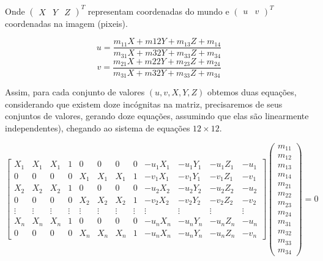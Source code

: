 \documentclass[ecp,tc]{iiufrgs}
\begin{document}
Onde $ \begin{pmatrix} X & Y & Z \end{pmatrix}^T $ representam coordenadas do mundo e $ \begin{pmatrix} u & v \end{pmatrix}^T $ coordenadas na imagem (pixeis).

\[
u = \dfrac{m_{11}X + m{12}Y + m_{13}Z + m_{14}}{m_{31}X + m{32}Y + m_{33}Z + m_{34}}
\]
\[
v = \dfrac{m_{21}X + m{22}Y + m_{23}Z + m_{24}}{m_{31}X + m{32}Y + m_{33}Z + m_{34}}
\]

Assim, para cada conjunto de valores $ (u, v, X, Y, Z) $ obtemos duas equações, considerando que existem doze incógnitas na matriz, precisaremos de seus conjuntos de valores, gerando doze equações, assumindo que elas são linearmente independentes),
chegando ao sistema de equações $ 12\times12 $.

\setcounter{MaxMatrixCols}{20}

\[
\begin{bmatrix}
X_1 & X_1 & X_1 & 1 & 0 & 0 & 0 & 0 & -u_1X_1 & -u_1Y_1 & -u_1Z_1 & -u_1 \\
0 & 0 & 0 & 0 & X_1 & X_1 & X_1 & 1 & -v_1X_1 & -v_1Y_1 & -v_1Z_1 & -v_1 \\
X_2 & X_2 & X_2 & 1 & 0 & 0 & 0 & 0 & -u_2X_2 & -u_2Y_2 & -u_2Z_2 & -u_2 \\
0 & 0 & 0 & 0 & X_2 & X_2 & X_2 & 1 & -v_2X_2 & -v_2Y_2 & -v_2Z_2 & -v_2 \\
\vdots & \vdots & \vdots & \vdots & \vdots & \vdots & \vdots & \vdots & \vdots & \vdots & \vdots & \vdots \\
X_n & X_n & X_n & 1 & 0 & 0 & 0 & 0 & -u_nX_n & -u_nY_n & -u_nZ_n & -u_n \\
0 & 0 & 0 & 0 & X_n & X_n & X_n & 1 & -u_nX_n & -u_nY_n & -u_nZ_n & -v_n 
\end{bmatrix}
\begin{pmatrix}m_{11} \\ m_{12} \\ m_{13} \\ m_{14} \\ m_{21} \\ m_{22} \\ m_{23} \\ m_{24} \\ m_{31} \\ m_{32} \\ m_{33} \\ m_{34} \end{pmatrix} = 0
\]
\end{document}
